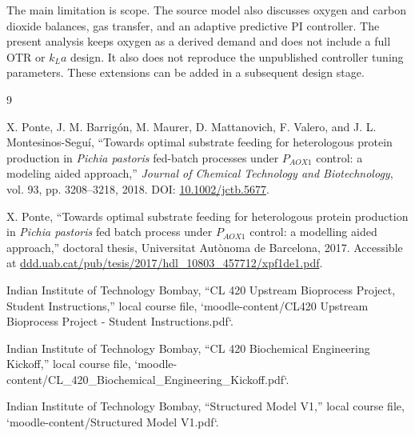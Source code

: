 \documentclass[10pt,a4paper]{article}
\newcommand{\Ppastoris}{\textit{Pichia pastoris}}
\begin{document}
The main limitation is scope. The source model also discusses oxygen and carbon dioxide balances, gas transfer, and an adaptive predictive PI controller. The present analysis keeps oxygen as a derived demand and does not include a full OTR or $k_La$ design. It also does not reproduce the unpublished controller tuning parameters. These extensions can be added in a subsequent design stage.

\begin{thebibliography}{9}
\small
\setlength{\itemsep}{1pt}

X. Ponte, J. M. Barrigón, M. Maurer, D. Mattanovich, F. Valero, and J. L. Montesinos-Seguí, ``Towards optimal substrate feeding for heterologous protein production in \Ppastoris{} fed-batch processes under $P_{AOX1}$ control: a modeling aided approach,'' \textit{Journal of Chemical Technology and Biotechnology}, vol. 93, pp. 3208--3218, 2018. DOI: \href{https://doi.org/10.1002/jctb.5677}{10.1002/jctb.5677}.

X. Ponte, ``Towards optimal substrate feeding for heterologous protein production in \Ppastoris{} fed batch process under $P_{AOX1}$ control: a modelling aided approach,'' doctoral thesis, Universitat Autònoma de Barcelona, 2017. Accessible at \href{https://ddd.uab.cat/pub/tesis/2017/hdl_10803_457712/xpf1de1.pdf}{ddd.uab.cat/pub/tesis/2017/hdl\_10803\_457712/xpf1de1.pdf}.

Indian Institute of Technology Bombay, ``CL 420 Upstream Bioprocess Project, Student Instructions,'' local course file, `moodle-content/CL420 Upstream Bioprocess Project - Student Instructions.pdf`.

Indian Institute of Technology Bombay, ``CL 420 Biochemical Engineering Kickoff,'' local course file, `moodle-content/CL\_420\_Biochemical\_Engineering\_Kickoff.pdf`.

Indian Institute of Technology Bombay, ``Structured Model V1,'' local course file, `moodle-content/Structured Model V1.pdf`.

\end{thebibliography}
\end{document}
